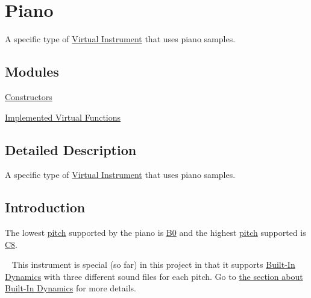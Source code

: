 \hypertarget{group___doc_piano}{}\section{Piano}
\label{group___doc_piano}


A specific type of \hyperlink{group___v_i}{Virtual Instrument} that uses piano samples.  


\subsection*{Modules}
\begin{DoxyCompactItemize}
\item 
\hyperlink{group___piano_construct}{Constructors}
\item 
\hyperlink{group___piano_virt_func}{Implemented Virtual Functions}
\end{DoxyCompactItemize}


\subsection{Detailed Description}
A specific type of \hyperlink{group___v_i}{Virtual Instrument} that uses piano samples. 

\hypertarget{group___doc_piano_DocPianoIntro}{}\subsection{Introduction}\label{group___doc_piano_DocPianoIntro}
The lowest \hyperlink{group___music_enums_ga508f69b199ea518f935486c990edac1d}{pitch} supported by the piano is \hyperlink{group___music_enums_ga508f69b199ea518f935486c990edac1d}{B0} and the highest \hyperlink{group___music_enums_ga508f69b199ea518f935486c990edac1d}{pitch} supported is \hyperlink{group___music_enums_ga508f69b199ea518f935486c990edac1d}{C8}.

~\newline
 This instrument is special (so far) in this project in that it supports \hyperlink{group___audio_DefBID}{Built-\/\+In Dynamics} with three different sound files for each pitch. Go to \hyperlink{group___audio_DefBID}{the section about Built-\/\+In Dynamics} for more details.

